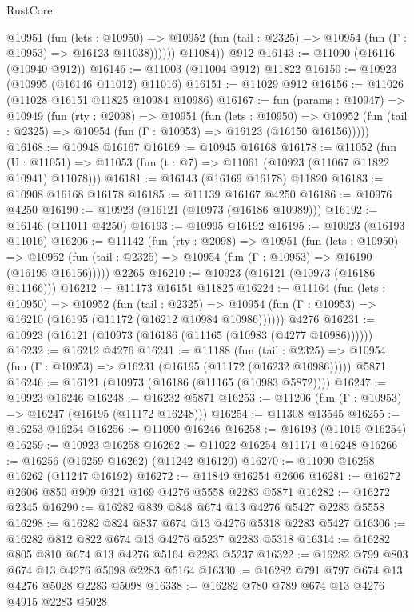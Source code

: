 \begin{lexlean}{RustCore}
\begin{coremodule}
            @10951
              (fun (lets : @10950) =>
              @10952 (fun (tail : @2325) => @10954 (fun (Γ : @10953) => @16123 @11038))))))
        @11084))
    @912
@16143 := @11090 (@16116 (@10940 @912))
@16146 := @11003 (@11004 @912) @11822
@16150 := @10923 (@10995 (@16146 @11012) @11016)
@16151 := @11029 @912
@16156 := @11026 (@11028 @16151 @11825 @10984 @10986)
@16167 := fun (params : @10947) =>
  @10949
    (fun (rty : @2098) =>
    @10951
      (fun (lets : @10950) =>
      @10952 (fun (tail : @2325) => @10954 (fun (Γ : @10953) => @16123 (@16150 @16156)))))
@16168 := @10948 @16167
@16169 := @10945 @16168
@16178 := @11052
    (fun (U : @11051) => @11053 (fun (t : @7) => @11061 (@10923 (@11067 @11822 @10941) @11078)))
@16181 := @16143 (@16169 @16178) @11820
@16183 := @10908 @16168 @16178
@16185 := @11139 @16167 @4250
@16186 := @10976 @4250
@16190 := @10923 (@16121 (@10973 (@16186 @10989)))
@16192 := @16146 (@11011 @4250)
@16193 := @10995 @16192
@16195 := @10923 (@16193 @11016)
@16206 := @11142
    (fun (rty : @2098) =>
    @10951
      (fun (lets : @10950) =>
      @10952 (fun (tail : @2325) => @10954 (fun (Γ : @10953) => @16190 (@16195 @16156)))))
    @2265
@16210 := @10923 (@16121 (@10973 (@16186 @11166)))
@16212 := @11173 @16151 @11825
@16224 := @11164
    (fun (lets : @10950) =>
    @10952
      (fun (tail : @2325) =>
      @10954 (fun (Γ : @10953) => @16210 (@16195 (@11172 (@16212 @10984 @10986))))))
    @4276
@16231 := @10923 (@16121 (@10973 (@16186 (@11165 (@10983 (@4277 @10986))))))
@16232 := @16212 @4276
@16241 := @11188
    (fun (tail : @2325) => @10954 (fun (Γ : @10953) => @16231 (@16195 (@11172 (@16232 @10986)))))
    @5871
@16246 := @16121 (@10973 (@16186 (@11165 (@10983 @5872))))
@16247 := @10923 @16246
@16248 := @16232 @5871
@16253 := @11206 (fun (Γ : @10953) => @16247 (@16195 (@11172 @16248)))
@16254 := @11308 @13545
@16255 := @16253 @16254
@16256 := @11090 @16246
@16258 := @16193 (@11015 @16254)
@16259 := @10923 @16258
@16262 := @11022 @16254 @11171 @16248
@16266 := @16256 (@16259 @16262) (@11242 @16120)
@16270 := @11090 @16258 @16262 (@11247 @16192)
@16272 := @11849 @16254 @2606
@16281 := @16272 @2606 @850 @909 @321 @169 @4276 @5558 @2283 @5871
@16282 := @16272 @2345
@16290 := @16282 @839 @848 @674 @13 @4276 @5427 @2283 @5558
@16298 := @16282 @824 @837 @674 @13 @4276 @5318 @2283 @5427
@16306 := @16282 @812 @822 @674 @13 @4276 @5237 @2283 @5318
@16314 := @16282 @805 @810 @674 @13 @4276 @5164 @2283 @5237
@16322 := @16282 @799 @803 @674 @13 @4276 @5098 @2283 @5164
@16330 := @16282 @791 @797 @674 @13 @4276 @5028 @2283 @5098
@16338 := @16282 @780 @789 @674 @13 @4276 @4915 @2283 @5028

\end{coremodule}
\end{lexlean}
